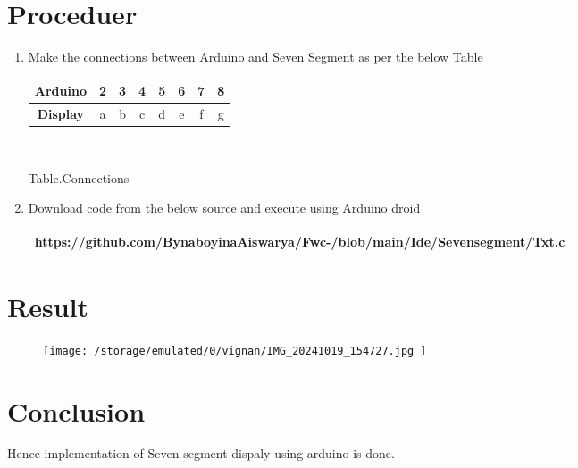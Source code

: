 \documentclass[journal,12pt,twocolumn]{IEEEtran}
\theoremstyle{remark}
\begin{document}
\section{Proceduer}
\begin{enumerate}
    \item Make the connections between Arduino and Seven Segment as per the below Table


\begin{table}[h!]
    \centering
    \small  %
    \begin{tabular}{|c|c|c|c|c|c|c|c|}
        \hline
        \textbf{Arduino}  & 2 & 3 & 4 & 5 & 6 & 7 & 8\\
        \hline
        \textbf{Display} &a&b&c&d&e&f&g\\
        \hline
    \end{tabular}\\
     \begin{center} 
 Table.Connections
 \end{center}
\end{table} 
    \item Download code from the below source and execute using Arduino droid \\

    \begin{tabularx}{0.46\textwidth} { 
  | >{\centering\arraybackslash}X |}
  \hline

    https://github.com/BynaboyinaAiswarya/Fwc-/blob/main/Ide/Sevensegment/Txt.c\\ 
  \hline
\end{tabularx}
 
\end{enumerate}


\section{Result}
\begin{figure}[h] 
	\centering 
	\texttt{[image:  /storage/emulated/0/vignan/IMG\_20241019\_154727.jpg   ]}
	\caption{\label{fig:Gates}}    
\end{figure}

\section{Conclusion}
Hence implementation of Seven segment dispaly using arduino is done.
\end{document}
